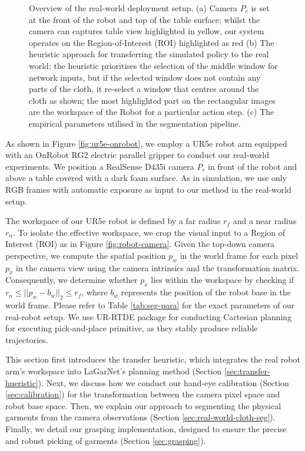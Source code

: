 \documentclass[journal]{IEEEtran}
\newcommand{\addinfo}[1]{\textcolor{myPurple}{#1}}
\newcommand{\addIncrementalg}[1]{\textcolor{mygreen}{#1}}
\begin{document}
\begin{figure}[t!]
    \caption{Overview of the real-world deployment setup. (a) \addinfo{Camera $P_c$ is set at the front of the robot and top of the table surface; whilst the camera can captures table view highlighted in yellow, our system operates on the Region-of-Interest (ROI) highlighted as red} (b) The heuristic approach for transferring the simulated policy to the real world; the heuristic prioritises the selection of the middle window for network inputs, but if the selected window does not contain any parts of the cloth, it re-select a window that centres around the cloth as shown; the most highlighted part on the rectangular images are the workspace of the  Robot for a particular action step. (c) The empirical parameters utilised in the segmentation pipeline.}
    \label{fig:real-world-overview}
\end{figure}
\addinfo{As shown in Figure \ref{fig:ur5e-onrobot}, we employ a UR5e robot arm equipped with an OnRobot RG2 electric parallel gripper to conduct our real-world experiments. We position a RealSense D435i camera $P_c$ in front of the robot and above a table covered with a dark foam surface. As in simulation, we use only RGB frames with automatic exposure as input to our method in the real-world setup.}

\addinfo{The workspace of our UR5e robot is defined by a far radius $r_{f}$ and a near radius $r_{n}$. To isolate the effective workspace, we crop the visual input to a Region of Interest (ROI) as in Figure \ref{fig:robot-camera}. Given the top-down camera perspective, we compute the spatial position $p_w$ in the world frame for each pixel $p_x$ in the camera view using the camera intrinsics and the transformation matrix. Consequently, we determine whether $p_x$ lies within the workspace by checking if $r_n \leq ||p_w - b_w||_2 \leq r_f$, where $b_w$ represents the position of the robot base in the world frame. Please refer to Table \ref{tab:seg-para} for the exact parameters of our real-robot setup.} \addinfo{We use UR-RTDE package \cite{urrtde2025} for conducting Cartesian planning for executing pick-and-place primitive, as they stably produce reliable trajectories.}

\addIncrementalg{This section first introduces the transfer heuristic, which integrates the real robot arm's workspace into LaGarNet's planning method (Section \ref{sec:transfer-hueristic}). Next, we discuss how we conduct our hand-eye calibration (Section \ref{sec:calibration}) for the transformation between the camera pixel space and robot base space. Then, we explain our approach to segmenting the physical garments from the camera observations (Section \ref{sec:real-world-cloth-seg}). Finally, we detail our grasping implementation, designed to ensure the precise and robust picking of garments (Section \ref{sec:grasping}).}
\end{document}
